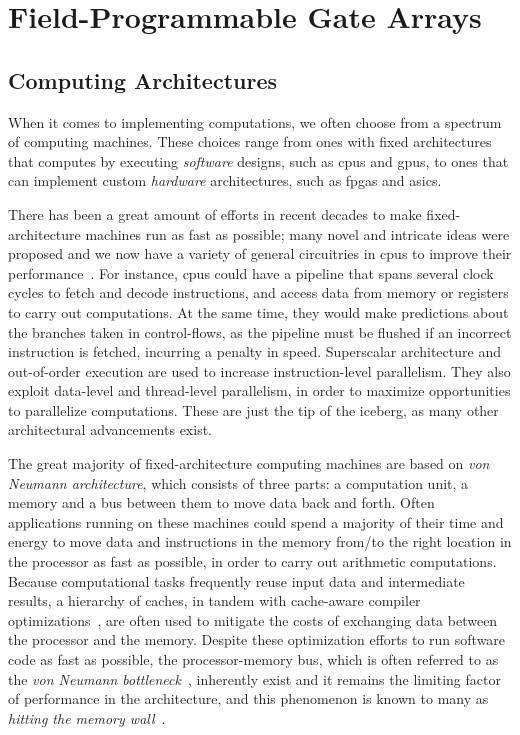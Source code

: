 \section{Field-Programmable Gate Arrays}
\label{bg:sec:fpga}

\subsection{Computing Architectures}
\label{bg:sub:computing_architectures}

When it comes to implementing computations, we often choose from a spectrum of
computing machines.  These choices range from ones with fixed architectures
that computes by executing \emph{software} designs, such as \glspl{cpu} and
\glspl{gpu}, to ones that can implement custom \emph{hardware} architectures,
such as \glspl{fpga} and \glspl{asic}.

There has been a great amount of efforts in recent decades to make
fixed-architecture machines run as fast as possible; many novel and intricate
ideas were proposed and we now have a variety of general circuitries in
\glspl{cpu} to improve their performance~\cite{comparch}.  For instance,
\glspl{cpu} could have a pipeline that spans several clock cycles to fetch and
decode instructions, and access data from memory or registers to carry out
computations.  At the same time, they would make predictions about the branches
taken in control-flows, as the pipeline must be flushed if an incorrect
instruction is fetched, incurring a penalty in speed.  Superscalar architecture
and out-of-order execution are used to increase instruction-level parallelism.
They also exploit data-level and thread-level parallelism, in order to maximize
opportunities to parallelize computations.  These are just the tip of the
iceberg, as many other architectural advancements exist.

The great majority of fixed-architecture computing machines are based on
\emph{von Neumann architecture}, which consists of three parts: a computation
unit, a memory and a bus between them to move data back and forth.  Often
applications running on these machines could spend a majority of their time
and energy to move data and instructions in the memory from/to the right
location in the processor as fast as possible, in order to carry out arithmetic
computations.  Because computational tasks frequently reuse input data and
intermediate results, a hierarchy of caches, in tandem with cache-aware
compiler optimizations~\cite{kowarschik03}, are often used to mitigate the
costs of exchanging data between the processor and the memory.  Despite
these optimization efforts to run software code as fast as possible, the
processor-memory bus, which is often referred to as the \emph{von Neumann
bottleneck}~\cite{backus78}, inherently exist and it remains the limiting
factor of performance in the architecture, and this phenomenon is known to many
as \emph{hitting the memory wall}~\cite{bacon13, wulf94}.

